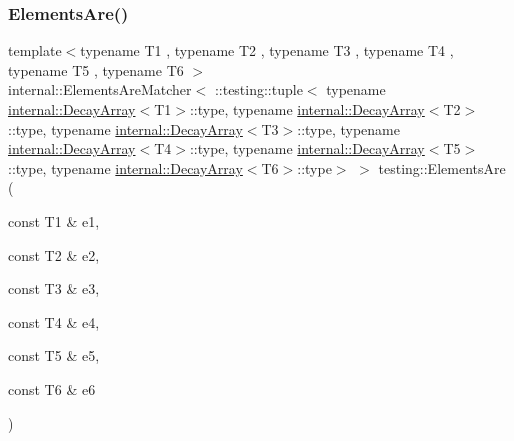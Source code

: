 \subsubsection{\texorpdfstring{ElementsAre()}{ElementsAre()}\hspace{0.1cm}{\footnotesize\ttfamily [7/11]}}
{\footnotesize\ttfamily template$<$typename T1 , typename T2 , typename T3 , typename T4 , typename T5 , typename T6 $>$ \\
internal\+::\+Elements\+Are\+Matcher$<$ \+::testing\+::tuple$<$ typename \mbox{\hyperlink{structtesting_1_1internal_1_1DecayArray}{internal\+::\+Decay\+Array}}$<$T1$>$\+::type, typename \mbox{\hyperlink{structtesting_1_1internal_1_1DecayArray}{internal\+::\+Decay\+Array}}$<$T2$>$\+::type, typename \mbox{\hyperlink{structtesting_1_1internal_1_1DecayArray}{internal\+::\+Decay\+Array}}$<$T3$>$\+::type, typename \mbox{\hyperlink{structtesting_1_1internal_1_1DecayArray}{internal\+::\+Decay\+Array}}$<$T4$>$\+::type, typename \mbox{\hyperlink{structtesting_1_1internal_1_1DecayArray}{internal\+::\+Decay\+Array}}$<$T5$>$\+::type, typename \mbox{\hyperlink{structtesting_1_1internal_1_1DecayArray}{internal\+::\+Decay\+Array}}$<$T6$>$\+::type$>$ $>$ testing\+::\+Elements\+Are (\begin{DoxyParamCaption}\item[{const T1 \&}]{e1,  }\item[{const T2 \&}]{e2,  }\item[{const T3 \&}]{e3,  }\item[{const T4 \&}]{e4,  }\item[{const T5 \&}]{e5,  }\item[{const T6 \&}]{e6 }\end{DoxyParamCaption})\hspace{0.3cm}{\ttfamily [inline]}}

\mbox{\label{namespacetesting_a3af9f549d951a4961825f821e6d47da9}} 

